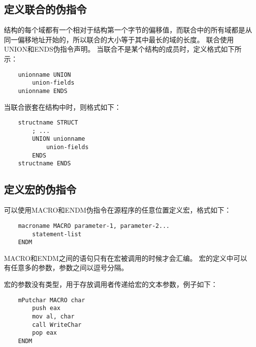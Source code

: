 \documentclass[a4paper,left=2.5cm,right=2.5cm,11pt]{article}
\begin{document}
\subsection{定义联合的伪指令}
	结构的每个域都有一个相对于结构第一个字节的偏移值，而联合中的所有域都是从同一偏移地址开始的，所以联合的大小等于其中最长的域的长度。
	联合使用UNION和ENDS伪指令声明。
	当联合不是某个结构的成员时，定义格式如下所示：
	\begin{lstlisting}
	unionname UNION
		union-fields
	unionname ENDS
	\end{lstlisting}

	当联合嵌套在结构中时，则格式如下：
	\begin{lstlisting}
	structname STRUCT
		; ...
		UNION unionname
			union-fields
		ENDS
	structname ENDS
	\end{lstlisting}

\subsection{定义宏的伪指令}
	可以使用MACRO和ENDM伪指令在源程序的任意位置定义宏，格式如下：
	\begin{lstlisting}
	macroname MACRO parameter-1, parameter-2...
		statement-list
	ENDM
	\end{lstlisting}

	MACRO和ENDM之间的语句只有在宏被调用的时候才会汇编。
	宏的定义中可以有任意多的参数，参数之间以逗号分隔。\par

	宏的参数没有类型，用于存放调用者传递给宏的文本参数，例子如下：
	\begin{lstlisting}
	mPutchar MACRO char
		push eax
		mov al, char
		call WriteChar
		pop eax
	ENDM
	\end{lstlisting}
\end{document}
